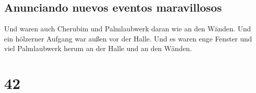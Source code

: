 \hypertarget{anunciando-nuevos-eventos-maravillosos}{%
\subsection{Anunciando nuevos eventos
maravillosos}\label{anunciando-nuevos-eventos-maravillosos}}

 Und waren auch Cherubim und Palmlaubwerk daran wie an
den Wänden. Und ein hölzerner Aufgang war außen vor der Halle.
 Und es waren enge Fenster und viel Palmlaubwerk herum an
der Halle und an den Wänden.

\hypertarget{section-41}{%
\section{42}\label{section-41}}

